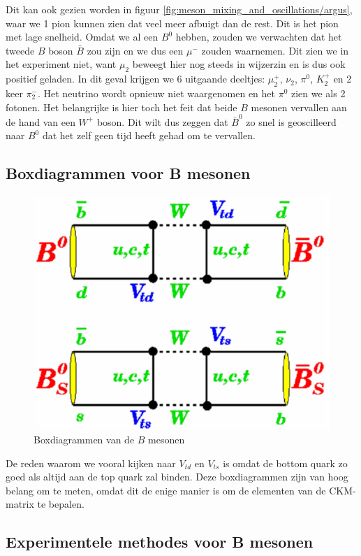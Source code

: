 \documentclass[../main.tex]{subfiles}
\begin{document}
Dit kan ook gezien worden in figuur \ref{fig:meson_mixing_and_oscillations/argus}, waar we 1 pion kunnen zien dat veel meer afbuigt dan de rest. Dit is het pion met lage snelheid. Omdat we al een $B^0$ hebben, zouden we verwachten dat het tweede $B$ boson $\bar{B}$ zou zijn en we dus een $\mu^-$ zouden waarnemen. Dit zien we in het experiment niet, want $\mu_2$ beweegt hier nog steeds in wijzerzin en is dus ook positief geladen. In dit geval krijgen we 6 uitgaande deeltjes: $\mu_2^+$, $\nu_2$, $\pi^0$, $K_2^+$ en 2 keer $\pi_2^-$. Het neutrino wordt opnieuw niet waargenomen en het $\pi^0$ zien we als 2 fotonen. Het belangrijke is hier toch het feit dat beide $B$ mesonen vervallen aan de hand van een $W^+$ boson. Dit wilt dus zeggen dat $\bar{B}^0$ zo snel is geoscilleerd naar $B^0$ dat het zelf geen tijd heeft gehad om te vervallen.

\subsection{Boxdiagrammen voor B mesonen}%
\label{sub:box_diagrammen_voor_b_mesonen}

\begin{figure}[h]
    \centering
    \includegraphics[width=0.5\linewidth]{meson_mixing_and_oscillations/box_diagr_b.png}
    \caption{Boxdiagrammen van de $B$ mesonen}%
    \label{fig:meson_mixing_and_oscillations/box_diagr_b}
\end{figure}

De reden waarom we vooral kijken naar $V_{td}$ en $V_{ts}$ is omdat de bottom quark zo goed als altijd aan de top quark zal binden. Deze boxdiagrammen zijn van hoog belang om te meten, omdat dit de enige manier is om de elementen van de CKM-matrix te bepalen.

\subsection{Experimentele methodes voor B mesonen}%
\label{sub:experimentele_methodes_voor_b_mesonen}
\end{document}
